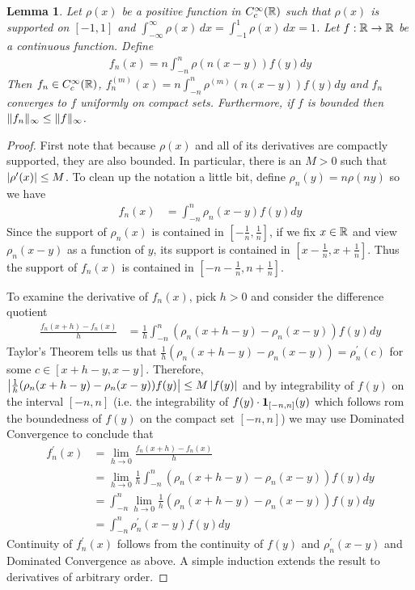 \documentclass{amsart}
\newtheorem{lem}[thm]{Lemma}
\theoremstyle{remark}
\theoremstyle{definition}
\begin{document}
\begin{lem}\label{ApproximationByMollifiers}Let $\rho(x)$ be a positive
  function in $C^\infty_c(\mathbb{R})$ such
  that $\rho(x)$ is supported on $[-1,1]$ and $\int_{-\infty}^\infty
  \rho(x) \, dx = \int_{-1}^1
  \rho(x) \, dx= 1$.  Let $f : \mathbb{R} \to \mathbb{R}$ be a continuous function.  Define 
\begin{align*}
f_n(x) = n \int_{-n}^n \rho(n(x - y)) f(y) dy
\end{align*}
Then $f_n \in C_c^\infty(\mathbb{R})$, $f_n^{(m)}(x) = n \int_{-n}^n
\rho^{(m)}(n(x -y)) f(y) dy$ and $f_n$ converges to $f$ uniformly on
compact sets.  Furthermore, if $f$ is bounded then $\lVert f_n \rVert_\infty \leq
\lVert f \rVert_\infty$.
\end{lem}
\begin{proof}
First note that because $\rho(x)$ and all of its derivatives are
compactly supported, they are also bounded.  In particular, there is
an $M > 0$ such that $\left \vert \rho^\prime(x) \right \vert \leq M$.  To clean up the notation
a little bit, define $\rho_n(y) = n\rho(ny)$ so we have
\begin{align*}
f_n(x) &= \int_{-n}^{n} \rho_n(x - y) f(y) dy
\end{align*}
Since the support of $\rho_n(x)$ is contained in
$[-\frac{1}{n},\frac{1}{n}]$, if we fix $x \in \mathbb{R}$ and
view $\rho_n(x - y)$ as a  function of $y$, its support is
contained in $[x-\frac{1}{n},x+\frac{1}{n}]$.  Thus the support of
$f_n(x)$ is contained in  $[-n-\frac{1}{n},n+\frac{1}{n}]$.

To examine the derivative
of $f_n(x)$, pick $h > 0$ and consider the difference
quotient
\begin{align*}
\frac{f_n(x + h) - f_n(x)}{h} &= \frac{1}{h} \int_{-n}^{n}
(\rho_n(x+h - y) - \rho_n(x - y) ) f(y) dy
\end{align*}
Taylor's Theorem tells us that $\frac{1}{h}(\rho_n(x+h - y) - \rho_n(x - y)) =
\rho_n^\prime(c)$ for some $c \in [x+h - y, x - y]$.  Therefore,
$\left \vert \frac{1}{h} (\rho_n(x+h - y) - \rho_n(x - y))f(y) \right \vert \leq M\left \vert f(y) \right \vert$ and by
integrability of $f(y)$ on the interval $[-n,n]$ (i.e. the
integrability of $f(y) \cdot \textbf{1}_{[-n,n]}(y)$ which follows
rom the boundedness of $f(y)$ on the compact set $[-n,n]$) we may use Dominated Convergence to conclude
that 
\begin{align*}
f_n^\prime(x) &=\lim_{h \to 0} \frac{f_n(x + h) - f_n(x)}{h} \\
&= \lim_{h \to 0} \frac{1}{h} \int_{-n}^{n}
(\rho_n(x+h - y) - \rho_n(x - y) ) f(y) dy \\
&= \int_{-n}^{n }
\lim_{h \to 0} \frac{1}{h} (\rho_n(x+h - y) - \rho_n(x - y) ) f(y) dy
\\
&= \int_{-n}^{n} \rho^\prime_n(x - y) f(y) dy 
\end{align*} 
Continuity of $f_n^\prime(x)$ follows from the continuity of $f(y)$
and $\rho^\prime_n(x - y) $ and Dominated Convergence as above.  A simple induction extends the result to derivatives of arbitrary
order.


\end{proof}
\end{document}
